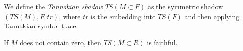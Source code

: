   
  
  

\begin{definition}
  We define the \emph{Tannakian shadow} $TS(M \subset F)$ as the symmetric shadow $(TS(M), F, tr)$, where $tr$ is the embedding into $TS(F)$ and then applying Tannakian symbol trace. 
\end{definition}

\begin{proposition}
  If $M$ does not contain zero, then $TS(M \subset R)$ is faithful. 
\end{proposition}

